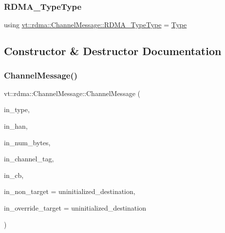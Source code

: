 \subsubsection{\texorpdfstring{R\+D\+M\+A\+\_\+\+Type\+Type}{RDMA\_TypeType}}
{\footnotesize\ttfamily using \hyperlink{namespacevt_1_1rdma_ac848e1d9da43db6294bd06f83e5d3946}{vt\+::rdma\+::\+Channel\+Message\+::\+R\+D\+M\+A\+\_\+\+Type\+Type} =  \hyperlink{namespacevt_1_1rdma_ac848e1d9da43db6294bd06f83e5d3946}{Type}}



\subsection{Constructor \& Destructor Documentation}
\mbox{\label{structvt_1_1rdma_1_1_channel_message_ad6ee8a328480b24231dd247397774d49}} 
\subsubsection{\texorpdfstring{Channel\+Message()}{ChannelMessage()}}
{\footnotesize\ttfamily vt\+::rdma\+::\+Channel\+Message\+::\+Channel\+Message (\begin{DoxyParamCaption}\item[{\hyperlink{namespacevt_1_1rdma_ac848e1d9da43db6294bd06f83e5d3946}{R\+D\+M\+A\+\_\+\+Type\+Type} const \&}]{in\+\_\+type,  }\item[{\hyperlink{namespacevt_a10442579ec4e7ebef223818e64bcf908}{R\+D\+M\+A\+\_\+\+Handle\+Type} const \&}]{in\+\_\+han,  }\item[{\hyperlink{namespacevt_aab8d55968084610ce3b17057981e9300}{Byte\+Type} const \&}]{in\+\_\+num\+\_\+bytes,  }\item[{\hyperlink{namespacevt_a84ab281dae04a52a4b243d6bf62d0e52}{Tag\+Type} const \&}]{in\+\_\+channel\+\_\+tag,  }\item[{\hyperlink{namespacevt_a36db99df4c973d48b1118a293fff533f}{Callback}$<$$>$}]{in\+\_\+cb,  }\item[{\hyperlink{namespacevt_a866da9d0efc19c0a1ce79e9e492f47e2}{Node\+Type} const \&}]{in\+\_\+non\+\_\+target = {\ttfamily uninitialized\+\_\+destination},  }\item[{\hyperlink{namespacevt_a866da9d0efc19c0a1ce79e9e492f47e2}{Node\+Type} const \&}]{in\+\_\+override\+\_\+target = {\ttfamily uninitialized\+\_\+destination} }\end{DoxyParamCaption})\hspace{0.3cm}{\ttfamily [inline]}}



